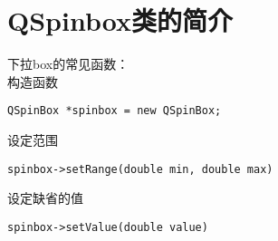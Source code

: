 \chapter{QSpinbox类的简介}
\noindent{}下拉box的常见函数：\\
构造函数
{\color{red}\begin{verbatim}QSpinBox *spinbox = new QSpinBox;\end{verbatim}}
\noindent{}设定范围
{\color{red}\begin{verbatim}spinbox->setRange(double min, double max)\end{verbatim}}
\noindent{}设定缺省的值
{\color{red}\begin{verbatim}spinbox->setValue(double value)\end{verbatim}}
